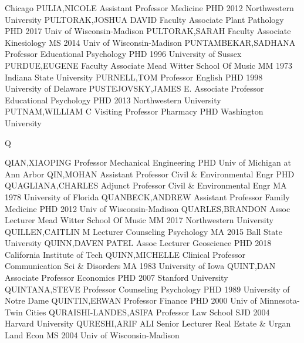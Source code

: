 \documentclass[
]{article}
\begin{document}
Chicago \textbar PULIA,NICOLE \textbar{}  \textbar Assistant
Professor \textbar Medicine \textbar PHD 2012 Northwestern University
\textbar PULTORAK,JOSHUA DAVID \textbar{}  \textbar Faculty
Associate \textbar Plant Pathology \textbar PHD 2017 Univ of
Wisconsin-Madison \textbar PULTORAK,SARAH \textbar{} 
\textbar Faculty Associate \textbar Kinesiology \textbar MS 2014 Univ of
Wisconsin-Madison \textbar PUNTAMBEKAR,SADHANA \textbar{} 
\textbar Professor \textbar Educational Psychology \textbar PHD 1996
University of Sussex \textbar PURDUE,EUGENE \textbar{} 
\textbar Faculty Associate \textbar Mead Witter School Of Music
\textbar MM 1973 Indiana State University \textbar PURNELL,TOM
\textbar{}  \textbar Professor \textbar English \textbar PHD
1998 University of Delaware \textbar PUSTEJOVSKY,JAMES E. \textbar{}
 \textbar Associate Professor \textbar Educational
Psychology \textbar PHD 2013 Northwestern University
\textbar PUTNAM,WILLIAM C \textbar{}  \textbar Visiting
Professor \textbar Pharmacy \textbar PHD Washington University
\textbar{}

Q

\textbar{}  \textbar{}

QIAN,XIAOPING \textbar Professor \textbar Mechanical Engineering
\textbar PHD Univ of Michigan at Ann Arbor \textbar{} 
\textbar QIN,MOHAN \textbar Assistant Professor \textbar Civil \&
Environmental Engr \textbar PHD \textbar{} 
\textbar QUAGLIANA,CHARLES \textbar Adjunct Professor \textbar Civil \&
Environmental Engr \textbar MA 1978 University of Florida \textbar{}
 \textbar QUANBECK,ANDREW \textbar Assistant Professor
\textbar Family Medicine \textbar PHD 2012 Univ of Wisconsin-Madison
\textbar{}  \textbar QUARLES,BRANDON \textbar Assoc Lecturer
\textbar Mead Witter School Of Music \textbar MM 2017 Northwestern
University \textbar{}  \textbar QUILLEN,CAITLIN M
\textbar Lecturer \textbar Counseling Psychology \textbar MA 2015 Ball
State University \textbar{}  \textbar QUINN,DAVEN PATEL
\textbar Assoc Lecturer \textbar Geoscience \textbar PHD 2018 California
Institute of Tech \textbar{}  \textbar QUINN,MICHELLE
\textbar Clinical Professor \textbar Communication Sci \& Disorders
\textbar MA 1983 University of Iowa \textbar{} 
\textbar QUINT,DAN \textbar Associate Professor \textbar Economics
\textbar PHD 2007 Stanford University \textbar{} 
\textbar QUINTANA,STEVE \textbar Professor \textbar Counseling
Psychology \textbar PHD 1989 University of Notre Dame \textbar{}
 \textbar QUINTIN,ERWAN \textbar Professor \textbar Finance
\textbar PHD 2000 Univ of Minnesota-Twin Cities \textbar{} 
\textbar QURAISHI-LANDES,ASIFA \textbar Professor \textbar Law School
\textbar SJD 2004 Harvard University \textbar{} 
\textbar QURESHI,ARIF ALI \textbar Senior Lecturer \textbar Real Estate
\& Urgan Land Econ \textbar MS 2004 Univ of Wisconsin-Madison \textbar{}
 \textbar{}
\end{document}
